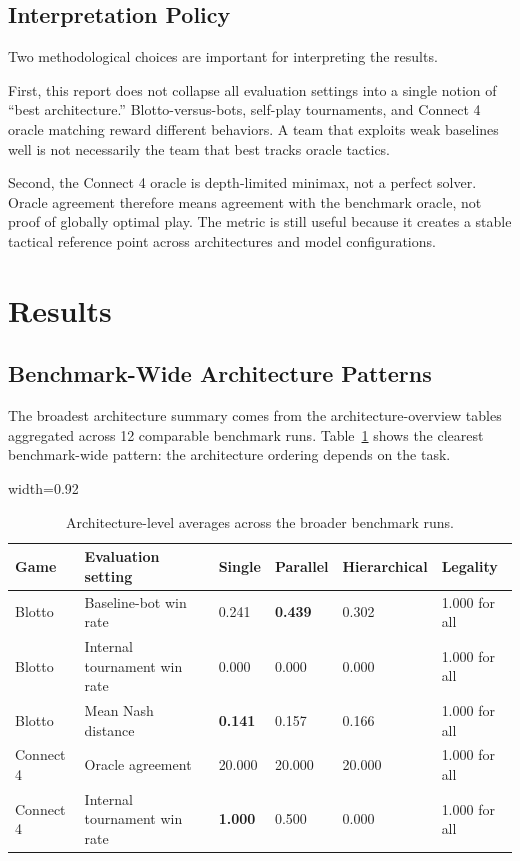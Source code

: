 \documentclass[11pt]{article}
\begin{document}
\subsection{Interpretation Policy}
Two methodological choices are important for interpreting the results.

First, this report does not collapse all evaluation settings into a single notion of ``best architecture.'' Blotto-versus-bots, self-play tournaments, and Connect 4 oracle matching reward different behaviors. A team that exploits weak baselines well is not necessarily the team that best tracks oracle tactics.

Second, the Connect 4 oracle is depth-limited minimax, not a perfect solver. Oracle agreement therefore means agreement with the benchmark oracle, not proof of globally optimal play. The metric is still useful because it creates a stable tactical reference point across architectures and model configurations.

\section{Results}

\subsection{Benchmark-Wide Architecture Patterns}
The broadest architecture summary comes from the architecture-overview tables aggregated across 12 comparable benchmark runs. Table~\ref{tab:arch-overview} shows the clearest benchmark-wide pattern: the architecture ordering depends on the task.

\begin{table}[H]
\centering
\caption{Architecture-level averages across the broader benchmark runs.}
\label{tab:arch-overview}
\begin{adjustbox}{width=0.92\textwidth}
\begin{tabular}{@{}llllll@{}}
\toprule
Game & Evaluation setting & Single & Parallel & Hierarchical & Legality \\
\midrule
Blotto & Baseline-bot win rate & 0.241 & \textbf{0.439} & 0.302 & 1.000 for all \\
Blotto & Internal tournament win rate & 0.000 & 0.000 & 0.000 & 1.000 for all \\
Blotto & Mean Nash distance & \textbf{0.141} & 0.157 & 0.166 & 1.000 for all \\
Connect 4 & Oracle agreement & 20.000 & 20.000 & 20.000 & 1.000 for all \\
Connect 4 & Internal tournament win rate & \textbf{1.000} & 0.500 & 0.000 & 1.000 for all \\
\bottomrule
\end{tabular}
\end{adjustbox}
\end{table}
\end{document}
